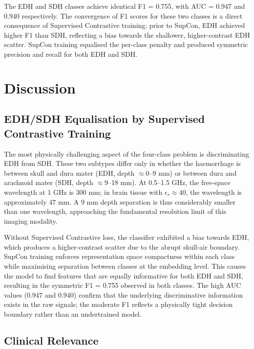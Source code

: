 \documentclass[journal]{IEEEtran}
\begin{document}
The EDH and SDH classes achieve identical F1 = 0.755, with
AUC = 0.947 and 0.940 respectively.  The convergence of F1
scores for these two classes is a direct consequence of
Supervised Contrastive training: prior to SupCon, EDH
achieved higher F1 than SDH, reflecting a bias towards the
shallower, higher-contrast EDH scatter.  SupCon training
equalised the per-class penalty and produced symmetric
precision and recall for both EDH and SDH.


\section{Discussion}
\label{sec:discussion}

\subsection{EDH/SDH Equalisation by Supervised Contrastive
            Training}

The most physically challenging aspect of the four-class
problem is discriminating EDH from SDH.  These two subtypes
differ only in whether the haemorrhage is between skull and
dura mater (EDH, depth $\approx$0--9 mm) or between dura
and arachnoid mater (SDH, depth $\approx$9--18 mm).  At
0.5--1.5 GHz, the free-space wavelength at 1 GHz is 300 mm;
in brain tissue with $\epsilon_r \approx 40$, the wavelength
is approximately 47 mm.  A 9 mm depth separation is thus
considerably smaller than one wavelength, approaching the
fundamental resolution limit of this imaging modality.

Without Supervised Contrastive loss, the classifier exhibited
a bias towards EDH, which produces a higher-contrast scatter
due to the abrupt skull-air boundary.  SupCon training
enforces representation space compactness within each class
while maximising separation between classes at the embedding
level.  This causes the model to find features that are
equally informative for both EDH and SDH, resulting in the
symmetric F1 = 0.755 observed in both classes.  The high AUC
values (0.947 and 0.940) confirm that the underlying
discriminative information exists in the raw signals; the
moderate F1 reflects a physically tight decision boundary
rather than an undertrained model.

\subsection{Clinical Relevance}
\end{document}
